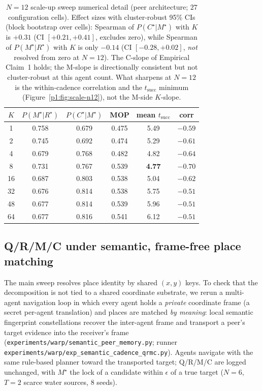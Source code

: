 \documentclass{article}
\newcommand{\method}[1]{\texttt{#1}}
\begin{document}
\begin{table}[h]
\caption{$N\!=\!12$ scale-up sweep numerical detail (peer architecture; $27$ configuration cells). Effect sizes with cluster-robust 95\% CIs (block bootstrap over cells): Spearman of $P(C^\star|M^\star)$ with $K$ is $+0.31$ (CI $[+0.21,+0.41]$, excludes zero), while Spearman of $P(M^\star|R^\star)$ with $K$ is only $-0.14$ (CI $[-0.28,+0.02]$, \emph{not} resolved from zero at $N{=}12$). The C-slope of Empirical Claim~1 holds; the M-slope is directionally consistent but not cluster-robust at this agent count. What sharpens at $N{=}12$ is the within-cadence correlation and the $t_{\mathrm{succ}}$ minimum (Figure~\ref{p1:fig:scale-n12}), not the M-side $K$-slope.}
\label{p1:tab:scale-n12}
\centering
\small
\begin{tabular}{c c c c c c}
\toprule
$K$ & $P(M^\star|R^\star)$ & $P(C^\star|M^\star)$ & MOP & mean $t_{\mathrm{succ}}$ & corr \\
\midrule
1  & 0.758 & 0.679 & 0.475 & 5.49 & $-0.59$ \\
2  & 0.745 & 0.692 & 0.474 & 5.29 & $-0.61$ \\
4  & 0.679 & 0.768 & 0.482 & 4.82 & $-0.64$ \\
8  & 0.731 & 0.767 & 0.539 & \textbf{4.77} & $\mathbf{-0.70}$ \\
16 & 0.687 & 0.803 & 0.538 & 5.04 & $-0.62$ \\
32 & 0.676 & 0.814 & 0.538 & 5.75 & $-0.51$ \\
48 & 0.677 & 0.814 & 0.539 & 5.96 & $-0.51$ \\
64 & 0.677 & 0.816 & 0.541 & 6.12 & $-0.51$ \\
\bottomrule
\end{tabular}
\end{table}

\subsection{Q/R/M/C under semantic, frame-free place matching}
\label{p1:app:semantic-matching}

The main sweep resolves place identity by shared $(x,y)$ keys. To check that
the decomposition is not tied to a shared coordinate substrate, we rerun a
multi-agent navigation loop in which every agent holds a \emph{private}
coordinate frame (a secret per-agent translation) and places are matched
\emph{by meaning}: local semantic fingerprint constellations recover the
inter-agent frame and transport a peer's target evidence into the receiver's
frame (\method{experiments/warp/semantic\_peer\_memory.py}; runner
\method{experiments/warp/exp\_semantic\_cadence\_qrmc.py}). Agents navigate with
the same rule-based planner toward the transported target; Q/R/M/C are logged
unchanged, with $M^\star$ the lock of a candidate within $\epsilon$ of a true
target ($N{=}6$, $T{=}2$ scarce water sources, $8$ seeds).
\end{document}
